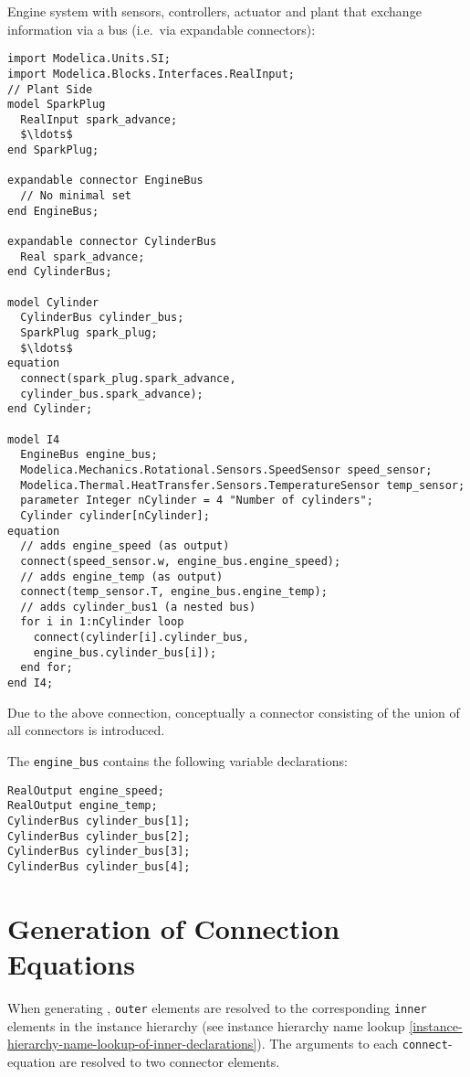 \begin{example}
Engine system with sensors, controllers, actuator and plant that exchange information via a bus (i.e.\ via expandable connectors):
\begin{lstlisting}[language=modelica]
import Modelica.Units.SI;
import Modelica.Blocks.Interfaces.RealInput;
// Plant Side
model SparkPlug
  RealInput spark_advance;
  $\ldots$
end SparkPlug;

expandable connector EngineBus
  // No minimal set
end EngineBus;

expandable connector CylinderBus
  Real spark_advance;
end CylinderBus;

model Cylinder
  CylinderBus cylinder_bus;
  SparkPlug spark_plug;
  $\ldots$
equation
  connect(spark_plug.spark_advance,
  cylinder_bus.spark_advance);
end Cylinder;

model I4
  EngineBus engine_bus;
  Modelica.Mechanics.Rotational.Sensors.SpeedSensor speed_sensor;
  Modelica.Thermal.HeatTransfer.Sensors.TemperatureSensor temp_sensor;
  parameter Integer nCylinder = 4 "Number of cylinders";
  Cylinder cylinder[nCylinder];
equation
  // adds engine_speed (as output)
  connect(speed_sensor.w, engine_bus.engine_speed);
  // adds engine_temp (as output)
  connect(temp_sensor.T, engine_bus.engine_temp);
  // adds cylinder_bus1 (a nested bus)
  for i in 1:nCylinder loop
    connect(cylinder[i].cylinder_bus,
    engine_bus.cylinder_bus[i]);
  end for;
end I4;
\end{lstlisting}
Due to the above connection, conceptually a connector consisting of the union of all connectors is introduced.

The \lstinline!engine_bus! contains the following variable declarations:
\begin{lstlisting}[language=modelica]
RealOutput engine_speed;
RealOutput engine_temp;
CylinderBus cylinder_bus[1];
CylinderBus cylinder_bus[2];
CylinderBus cylinder_bus[3];
CylinderBus cylinder_bus[4];
\end{lstlisting}
\end{example}

\section{Generation of Connection Equations}\label{generation-of-connection-equations}

When generating , \lstinline!outer! elements are resolved to the corresponding \lstinline!inner! elements in the instance hierarchy (see instance hierarchy name lookup \cref{instance-hierarchy-name-lookup-of-inner-declarations}).
The arguments to each \lstinline!connect!-equation are resolved to two connector elements.


